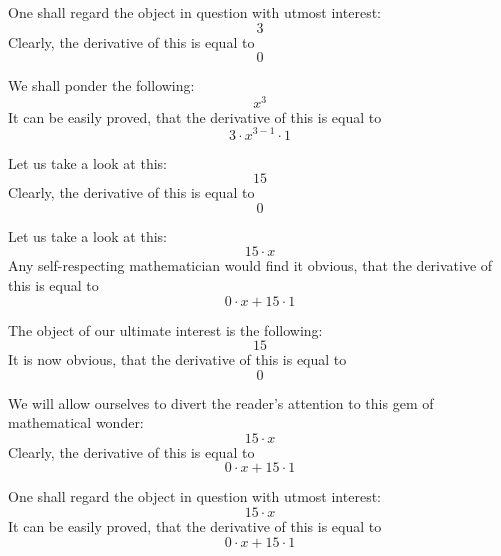 \documentclass{article}
\begin{document}
One shall regard the object in question with utmost interest:
\begin{equation}
3 
\end{equation}
Clearly, the derivative of this is equal to
\begin{equation}
0 
\end{equation}

We shall ponder the following:
\begin{equation}
x ^{3 } 
\end{equation}
It can be easily proved, that the derivative of this is equal to
\begin{equation}
3 \cdot x ^{3 - 1 } \cdot 1 
\end{equation}

Let us take a look at this:
\begin{equation}
15 
\end{equation}
Clearly, the derivative of this is equal to
\begin{equation}
0 
\end{equation}

Let us take a look at this:
\begin{equation}
15 \cdot x 
\end{equation}
Any self-respecting mathematician would find it obvious, that the derivative of this is equal to
\begin{equation}
0 \cdot x + 15 \cdot 1 
\end{equation}

The object of our ultimate interest is the following:
\begin{equation}
15 
\end{equation}
It is now obvious, that the derivative of this is equal to
\begin{equation}
0 
\end{equation}

We will allow ourselves to divert the reader's attention to this gem of mathematical wonder:
\begin{equation}
15 \cdot x 
\end{equation}
Clearly, the derivative of this is equal to
\begin{equation}
0 \cdot x + 15 \cdot 1 
\end{equation}

One shall regard the object in question with utmost interest:
\begin{equation}
15 \cdot x 
\end{equation}
It can be easily proved, that the derivative of this is equal to
\begin{equation}
0 \cdot x + 15 \cdot 1 
\end{equation}
\end{document}
